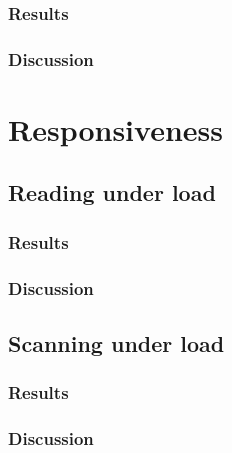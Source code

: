 \subsubsection{Results\label{subse:resultsProductionSuitability}}

\subsubsection{Discussion\label{subse:discussionProductionSuitability}}

\section{Responsiveness\label{se:responsiveness}}

\subsection{Reading under load\label{subse:readingUnderLoadEvaluation}}

\subsubsection{Results\label{subse:resultsReadingUnderLoad}}

\subsubsection{Discussion\label{subse:discussionReadingUnderLoad}}

\subsection{Scanning under load\label{subse:scanningUnderLoad}}

\subsubsection{Results\label{subse:resultsScanningUnderLoad}}

\subsubsection{Discussion\label{subse:discussionScanningUnderLoad}}
